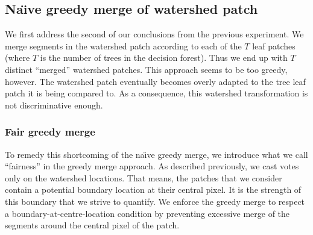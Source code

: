 \subsection{Na\"{\i}ve greedy merge of watershed patch}
We first address the second of our conclusions from the previous experiment. We merge segments in the watershed patch according to each of the $T$ leaf patches (where $T$ is the number of trees in the decision forest). Thus we end up with $T$ distinct ``merged'' watershed patches. This approach seems to be too greedy, however. The watershed patch eventually becomes overly adapted to the tree leaf patch it is being compared to. As a consequence, this watershed transformation is not discriminative enough.

\subsubsection{Fair greedy merge}
To remedy this shortcoming of the na\"{\i}ve greedy merge, we introduce what we call ``fairness'' in the greedy merge approach. As described previously, we cast votes only on the watershed locations. That means, the patches that we consider contain a potential boundary location at their central pixel. It is the strength of this boundary that we strive to quantify. We enforce the greedy merge to respect a boundary-at-centre-location condition by preventing excessive merge of the segments around the central pixel of the patch.

